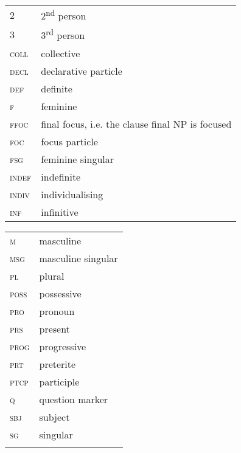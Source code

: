 \documentclass[output=paper]{langsci/langscibook}
\begin{document}
\begin{tabularx}{.45\textwidth}{lX}
2 & 2\textsuperscript{nd} person \\
3 & 3\textsuperscript{rd} person \\
\textsc{coll} & collective \\
\textsc{decl} & declarative particle \\
\textsc{def} & definite \\
\textsc{f} & feminine \\ 
\textsc{ffoc} & final focus, i.e. the clause final NP is focused \\
\textsc{foc} & focus particle \\
\textsc{fsg} & feminine singular \\
\textsc{indef} & indefinite \\
\textsc{indiv} & individualising \\
\textsc{inf} & infinitive \\
\end{tabularx}
\begin{tabularx}{.45\textwidth}{lX} 
\textsc{m} & masculine \\
\textsc{msg} & masculine singular \\
\textsc{pl} & plural \\
\textsc{poss} & possessive \\
\textsc{pro} & pronoun \\
\textsc{prs} & present \\ 
\textsc{prog} & progressive \\
\textsc{prt} & preterite \\
\textsc{ptcp} & participle \\
\textsc{q} & question marker \\
\textsc{sbj} & subject \\
\textsc{sg} & singular \\
\\
\end{tabularx}



 
 
\newpage
\printbibliography[heading=subbibliography,notkeyword=this]
\end{document}
